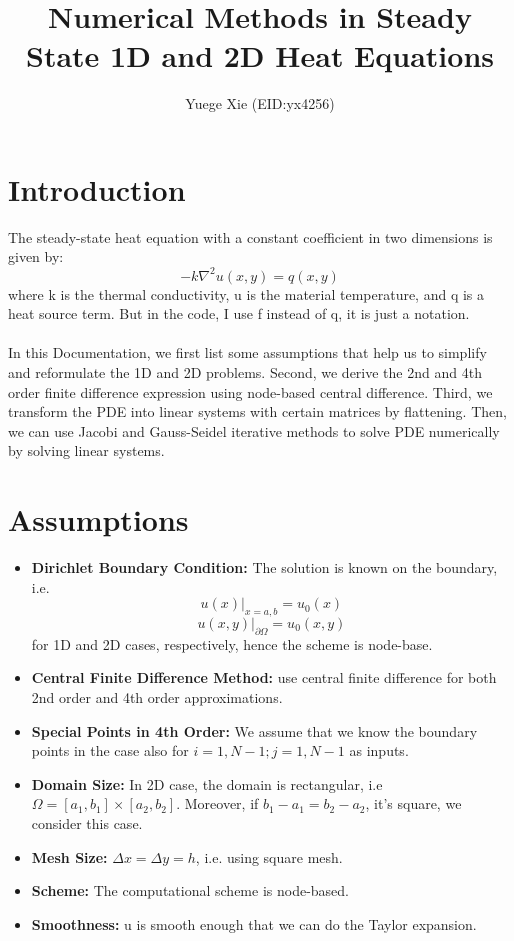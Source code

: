 \documentclass[a4paper]{article}
\title{Numerical Methods in Steady State 1D and 2D Heat Equations}
\author{Yuege Xie (EID:yx4256)}
\date{}
\begin{document}
\maketitle
\tableofcontents

\newpage
\section{Introduction}
\label{sec:introduction}

The steady-state heat equation with a constant coefficient in two dimensions is given by:
$$-k\nabla^2u(x,y) = q(x,y)$$
where k is the thermal conductivity, u is the material temperature, and q is a heat source term. But in the code, I use f instead of q, it is just a notation.\\\\
In this Documentation, we first list some assumptions that help us to simplify and reformulate the 1D and 2D problems. Second, we derive the 2nd and 4th order finite difference expression using node-based central difference. Third, we transform the PDE into linear systems with certain matrices by flattening. Then, we can use Jacobi and Gauss-Seidel iterative methods to solve PDE numerically by solving linear systems. 

\section{Assumptions}
\begin{itemize}
    \item \textbf{Dirichlet Boundary Condition:} The solution is known on the boundary, i.e.
    $$ u(x)|_{x=a,b} = u_0(x)$$
    $$u(x,y)|_{\partial\Omega} = u_0(x,y)$$
    for 1D and 2D cases, respectively, hence the scheme is node-base.
    \item \textbf{Central Finite Difference Method:} use central finite difference for both 2nd order and 4th order approximations.
    \item \textbf{Special Points in 4th Order:} We assume that we know the boundary points in the case also for $i=1,N-1; j=1,N-1 $ as inputs.
    \item \textbf{Domain Size:} In 2D case, the domain is rectangular, i.e $\Omega = [a_1,b_1] \times [a_2,b_2]$. Moreover, if $b_1-a_1 = b_2-a_2$, it's square, we consider this case.
    \item \textbf{Mesh Size:} $\Delta x = \Delta y = h$, i.e. using square mesh.
    \item \textbf{Scheme:} The computational scheme is node-based.
    \item \textbf{Smoothness:} u is smooth enough that we can do the Taylor expansion.
\end{itemize}
\end{document}
